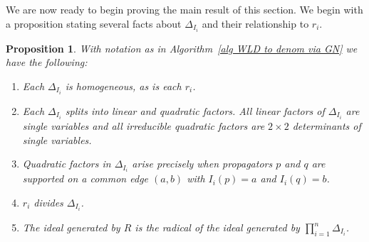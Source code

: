 \documentclass[11pt]{article}
\newtheorem{prop}[thm]{Proposition}
\theoremstyle{remark}
\theoremstyle{definition}
\begin{document}
We are now ready to begin proving the main result of this section. We begin with a proposition stating several facts about $\Delta_{I_i}$ and their relationship to $r_i$.

\begin{prop}\label{prop alg gives rad}
  With notation as in Algorithm~\ref{alg WLD to denom via GN} we have the following:
  \begin{enumerate}
    \item Each $\Delta_{I_i}$ is homogeneous, as is each $r_i$.
    \item Each $\Delta_{I_i}$ splits into linear and quadratic factors.  All linear factors of  $\Delta_{I_i}$ are single variables and all irreducible quadratic factors are $2\times 2$ determinants of single variables.
    \item Quadratic factors in $\Delta_{I_i}$ arise precisely when propagators $p$ and $q$ are supported on a common edge $(a,b)$ with $I_i(p)=a$ and $I_i(q)=b$.
    \item $r_i$ divides $\Delta_{I_i}$.
    \item The ideal generated by $R$ is the radical of the ideal generated by $\prod_{i=1}^{n}\Delta_{I_i}$.
  \end{enumerate}
\end{prop}
\end{document}
